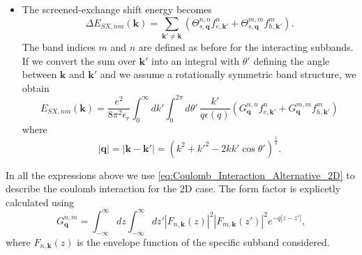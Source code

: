 \begin{itemize}
\item The screened-exchange shift energy becomes\begin{equation}
\Delta E_{SX,nm}(\mathbf{k})=\sum_{\mathbf{k}'\neq\mathbf{k}}\left(\Theta_{s,\mathbf{q}}^{n,n}f_{e,\mathbf{k}'}^{n}+\Theta_{s,\mathbf{q}}^{m,m}f_{h,\mathbf{k}'}^{m}\right).\end{equation}
The band indices $m$ and $n$ are defined as before for the interacting
subbands. If we convert the sum over $\mathbf{k}'$ into an integral
with $\theta'$ defining the angle between $\mathbf{k}$ and $\mathbf{k}'$
and we assume a rotationally symmetric band structure, we obtain\begin{equation}
E_{SX,nm}(\mathbf{k})=\frac{e^{2}}{8\pi^{2}\epsilon_{r}}\int_{0}^{\infty}dk'\int_{0}^{2\pi}d\theta'\,\frac{k'}{q\epsilon(q)}\left(G_{\mathbf{q}}^{n,n}f_{e,\mathbf{k}'}^{n}+G_{\mathbf{q}}^{m,m}f_{h,\mathbf{k}'}^{m}\right)\end{equation}
where \begin{equation}
\left|\mathbf{q}\right|=\left|\mathbf{k}-\mathbf{k}'\right|=\left(k^{2}+k'^{2}-2kk'\cos\theta'\right)^{\frac{1}{2}}.\end{equation}

\end{itemize}
In all the expressions above we use \ref{eq:Coulomb_Interaction_Alternative_2D}
to describe the coulomb interaction for the 2D case. The form factor
is explicetly calculated using \begin{equation}
G_{\mathbf{q}}^{n,m}=\int_{-\infty}^{\infty}dz\int_{-\infty}^{\infty}dz'\left|F_{n,\mathbf{k}}(z)\right|^{2}\left|F_{m,\mathbf{k}}(z')\right|^{2}e^{-q\left|z-z'\right|},\end{equation}
where $F_{n,\mathbf{k}}(z)$ is the envelope function of the specific
subband considered.

